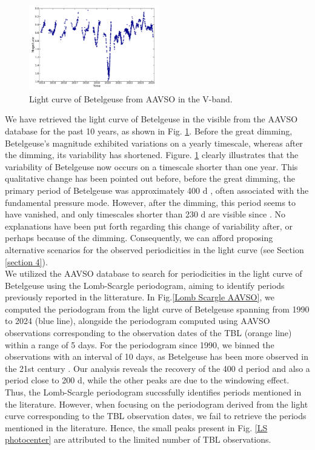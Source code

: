 \documentclass{aa}
\begin{document}
\begin{figure}[!h]
    \centering
    \includegraphics[width=0.5\textwidth]{Light_curve_Betelgeuse.pdf}
    \caption{Light curve of Betelgeuse from AAVSO in the V-band.}
    \label{light curve Betelgeuse}
\end{figure}


We have retrieved the light curve of Betelgeuse in the visible from the AAVSO database for the past 10 years, as shown in Fig. \ref{light curve Betelgeuse}.
Before the great dimming, Betelgeuse's magnitude exhibited variations on a yearly timescale, whereas after the dimming, its variability has shortened. 
Figure. \ref{light curve Betelgeuse} clearly illustrates that the 
variability of Betelgeuse now occurs on a timescale shorter than one year. This qualitative change has been pointed out before,
before the great dimming, the primary period of Betelgeuse was approximately 400 d \citep{kiss_variability_2006}, often associated with the fundamental pressure mode. However, after the dimming, this period seems to have vanished, and only timescales shorter than 230 d are visible since \citep{dupree_great_2022}. 
No explanations have been put forth regarding this change of variability after, or perhaps because of the dimming. Consequently, we can afford proposing alternative scenarios for the observed periodicities in the light curve (see Section \ref{section 4}).\\


We utilized the AAVSO database to search for periodicities in the light curve of Betelgeuse using the Lomb-Scargle periodogram, aiming to identify periods previously reported in the litterature. In Fig.\ref{Lomb Scargle AAVSO}, we computed the periodogram from the light curve of Betelgeuse spanning from 1990 to 2024 (blue line), alongside the periodogram computed using AAVSO observations corresponding to the observation dates of the TBL (orange line) within a range of 5 days. For the periodogram since 1990, we binned the observations with an interval of 10 days, as Betelgeuse has been more observed in the 21st century \citep{kiss_variability_2006}. Our analysis reveals the recovery of the 400 d period and also a period close to 200 d, while the other peaks are due to the windowing effect. Thus, the Lomb-Scargle periodogram succssfully identifies periods mentioned in the literature. However, when focusing on the periodogram derived from the light curve corresponding to the TBL observation dates, we fail to retrieve the periods mentioned in the literature. Hence, the small peaks present in Fig. \ref{LS photocenter} are attributed to the limited number of TBL observations.
\end{document}
